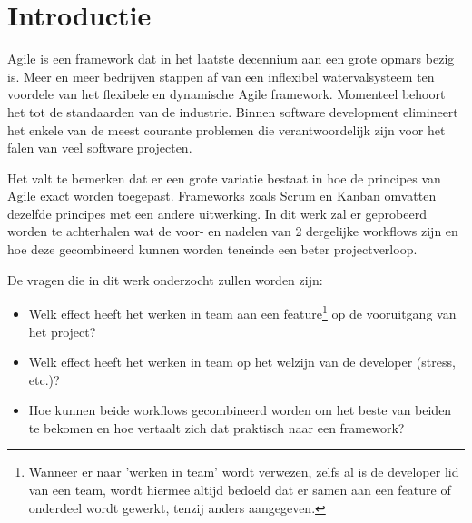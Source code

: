
\section{Introductie} %
\label{sec:introductie}

%


Agile is een framework dat in het laatste decennium aan een grote opmars bezig is. Meer en meer bedrijven stappen af van een inflexibel watervalsysteem ten voordele van het flexibele en dynamische Agile framework. Momenteel behoort het tot de standaarden van de industrie. Binnen software development elimineert het enkele van de meest courante problemen die verantwoordelijk zijn voor het falen van veel software projecten.

Het valt te bemerken dat er een grote variatie bestaat in hoe de principes van Agile exact worden toegepast. Frameworks zoals Scrum en Kanban omvatten dezelfde principes met een andere uitwerking. In dit werk zal er geprobeerd worden te achterhalen wat de voor- en nadelen van 2 dergelijke workflows zijn en hoe deze gecombineerd kunnen worden teneinde een beter projectverloop. 

De vragen die in dit werk onderzocht zullen worden zijn:
\begin{itemize}
\item Welk effect heeft het werken in team aan een feature\footnote{Wanneer er naar 'werken in team' wordt verwezen, zelfs al is de developer lid van een team, wordt hiermee altijd bedoeld dat er samen aan een feature of onderdeel wordt gewerkt, tenzij anders aangegeven.} op de vooruitgang van het project?
\item Welk effect heeft het werken in team op het welzijn van de developer (stress, etc.)?
\item Hoe kunnen beide workflows gecombineerd worden om het beste van beiden te bekomen en hoe vertaalt zich dat praktisch naar een framework?
\end{itemize}

